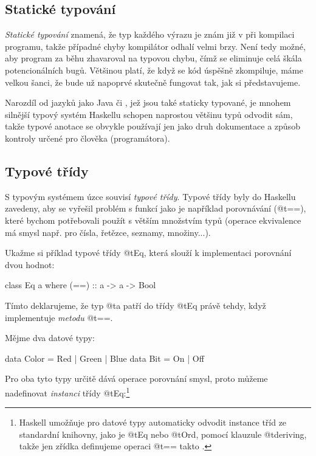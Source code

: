 \subsection{Statické typování}

\emph{Statické typování} znamená, že typ každého výrazu je znám již v při
kompilaci programu, takže případné chyby kompilátor odhalí velmi brzy. Není tedy
možné, aby program za běhu zhavaroval na typovou chybu, čímž se eliminuje celá
škála potencionálních bugů. Většinou platí, že když se kód úspěšně zkompiluje,
máme velkou šanci, že bude už napoprvé skutečně fungovat tak, jak si
představujeme.

Narozdíl od jazyků jako Java či \Cplusplus, jež jsou také staticky typované, je
mnohem silnější typový systém Haskellu schopen naprostou většinu typů odvodit
sám, takže typové anotace se obvykle používají jen jako druh dokumentace a
způsob kontroly určené pro člověka (programátora).

\subsection{Typové třídy}

S typovým systémem úzce souvisí \emph{typové třídy}. Typové třídy byly do
Haskellu zavedeny, aby se vyřešil problém s  funkcí jako je
například porovnávání (@t{==}), které bychom potřebovali použít s větším
množstvím typů (operace ekvivalence má smysl např. pro čísla, řetězce, seznamy,
množiny...).

Ukažme si příklad typové třídy @t{Eq}, která slouží k implementaci porovnání
dvou hodnot:

\begin{haskell}
class Eq a where
  (==) :: a -> a -> Bool
\end{haskell}

Tímto deklarujeme, že typ @t{a} patří do třídy @t{Eq} právě tehdy, když
implementuje \emph{metodu} @t{==}.

Mějme dva datové typy:

\begin{haskell}
data Color = Red | Green | Blue
data Bit = On | Off
\end{haskell}

Pro oba tyto typy určitě dává operace porovnání smysl, proto můžeme nadefinovat
\emph{instanci} třídy @t{Eq}:\footnote{Haskell umožňuje pro datové typy
  automaticky odvodit instance tříd ze standardní knihovny, jako je @t{Eq} nebo
@t{Ord}, pomocí klauzule @t{deriving}, takže jen zřídka definujeme operaci
@t{==} takto .}

